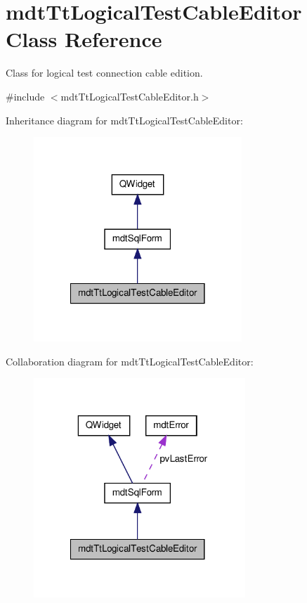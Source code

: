 \hypertarget{classmdt_tt_logical_test_cable_editor}{\section{mdt\-Tt\-Logical\-Test\-Cable\-Editor Class Reference}
\label{classmdt_tt_logical_test_cable_editor}
}


Class for logical test connection cable edition.  




{\ttfamily \#include $<$mdt\-Tt\-Logical\-Test\-Cable\-Editor.\-h$>$}



Inheritance diagram for mdt\-Tt\-Logical\-Test\-Cable\-Editor\-:\nopagebreak
\begin{figure}[H]
\begin{center}
\leavevmode
\includegraphics[width=222pt]{classmdt_tt_logical_test_cable_editor__inherit__graph}
\end{center}
\end{figure}


Collaboration diagram for mdt\-Tt\-Logical\-Test\-Cable\-Editor\-:\nopagebreak
\begin{figure}[H]
\begin{center}
\leavevmode
\includegraphics[width=226pt]{classmdt_tt_logical_test_cable_editor__coll__graph}
\end{center}
\end{figure}
